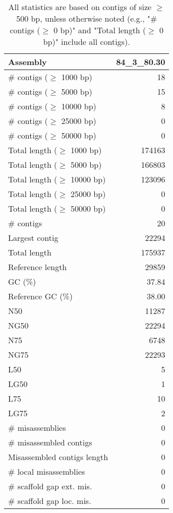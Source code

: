 \documentclass[12pt,a4paper]{article}
\begin{document}
\begin{table}[ht]
\begin{center}
\caption{All statistics are based on contigs of size $\geq$ 500 bp, unless otherwise noted (e.g., "\# contigs ($\geq$ 0 bp)" and "Total length ($\geq$ 0 bp)" include all contigs).}
\begin{tabular}{|l*{1}{|r}|}
\hline
Assembly & 84\_3\_80.30 \\ \hline
\# contigs ($\geq$ 1000 bp) & 18 \\ \hline
\# contigs ($\geq$ 5000 bp) & 15 \\ \hline
\# contigs ($\geq$ 10000 bp) & 8 \\ \hline
\# contigs ($\geq$ 25000 bp) & 0 \\ \hline
\# contigs ($\geq$ 50000 bp) & 0 \\ \hline
Total length ($\geq$ 1000 bp) & 174163 \\ \hline
Total length ($\geq$ 5000 bp) & 166803 \\ \hline
Total length ($\geq$ 10000 bp) & 123096 \\ \hline
Total length ($\geq$ 25000 bp) & 0 \\ \hline
Total length ($\geq$ 50000 bp) & 0 \\ \hline
\# contigs & 20 \\ \hline
Largest contig & 22294 \\ \hline
Total length & 175937 \\ \hline
Reference length & 29859 \\ \hline
GC (\%) & 37.84 \\ \hline
Reference GC (\%) & 38.00 \\ \hline
N50 & 11287 \\ \hline
NG50 & 22294 \\ \hline
N75 & 6748 \\ \hline
NG75 & 22293 \\ \hline
L50 & 5 \\ \hline
LG50 & 1 \\ \hline
L75 & 10 \\ \hline
LG75 & 2 \\ \hline
\# misassemblies & 0 \\ \hline
\# misassembled contigs & 0 \\ \hline
Misassembled contigs length & 0 \\ \hline
\# local misassemblies & 0 \\ \hline
\# scaffold gap ext. mis. & 0 \\ \hline
\# scaffold gap loc. mis. & 0 \\ \hline

\end{tabular}
\end{center}
\end{table}
\end{document}
